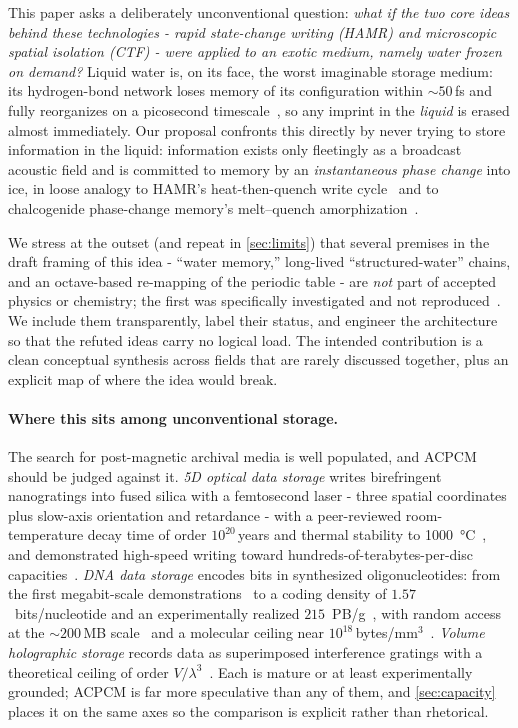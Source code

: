 \documentclass[11pt]{article}
\theoremstyle{definition}
\begin{document}
This paper asks a deliberately unconventional question: \emph{what if the two core ideas
behind these technologies - rapid state-change writing (HAMR) and microscopic spatial
isolation (CTF) - were applied to an exotic medium, namely water frozen on demand?} Liquid
water is, on its face, the worst imaginable storage medium: its hydrogen-bond network loses
memory of its configuration within ${\sim}50$\,fs and fully reorganizes on a picosecond
timescale~\cite{cowan2005water}, so any imprint in the \emph{liquid} is erased almost
immediately. Our proposal confronts this directly by never trying to store information in
the liquid: information exists only fleetingly as a broadcast acoustic field and is
committed to memory by an \emph{instantaneous phase change} into ice, in loose analogy to
HAMR's heat-then-quench write cycle~\cite{kryder2008hamr} and to chalcogenide phase-change
memory's melt--quench amorphization~\cite{ovshinsky1968,wuttig2007pcm}.

We stress at the outset (and repeat in \cref{sec:limits}) that several premises in the
draft framing of this idea - ``water memory,'' long-lived ``structured-water'' chains, and
an octave-based re-mapping of the periodic table - are \emph{not} part of accepted physics
or chemistry; the first was specifically investigated and not
reproduced~\cite{maddox1988,benveniste1988}. We include them transparently, label their
status, and engineer the architecture so that the refuted ideas carry no logical load. The
intended contribution is a clean conceptual synthesis across fields that are rarely
discussed together, plus an explicit map of where the idea would break.

\paragraph{Where this sits among unconventional storage.}
The search for post-magnetic archival media is well populated, and ACPCM should be judged
against it. \emph{5D optical data storage} writes birefringent nanogratings into fused
silica with a femtosecond laser - three spatial coordinates plus slow-axis orientation and
retardance - with a peer-reviewed room-temperature decay time of order $10^{20}$\,years and
thermal stability to \qty{1000}{\celsius}~\cite{zhang2014glass}, and demonstrated
high-speed writing toward hundreds-of-terabytes-per-disc capacities~\cite{lei2021optica}.
\emph{DNA data storage} encodes bits in synthesized oligonucleotides: from the first
megabit-scale demonstrations~\cite{church2012dna,goldman2013dna} to a coding density of
$1.57$~bits/nucleotide and an experimentally realized
$215$~PB/g~\cite{erlich2017fountain}, with random access at the
${\sim}200$\,MB scale~\cite{organick2018random} and a molecular ceiling near
$10^{18}$\,bytes/mm$^{3}$~\cite{ceze2019molecular}. \emph{Volume holographic storage}
records data as superimposed interference gratings with a theoretical ceiling of order
$V/\lambda^{3}$~\cite{heanue1994holographic,coufal2000holographic}. Each is mature or at
least experimentally grounded; ACPCM is far more speculative than any of them, and
\cref{sec:capacity} places it on the same axes so the comparison is explicit rather than
rhetorical.
\end{document}
